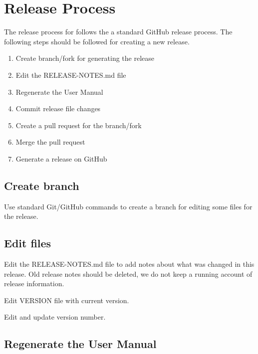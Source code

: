 
\chapter{Release Process}
\label{Release Process}

The release process for \parflow{} follows the a standard GitHub
release process.  The following steps should be followed for creating a new
\parflow{} release.

\begin{enumerate}
	\item Create branch/fork for generating the release
	\item Edit the RELEASE-NOTES.md file
	\item Regenerate the \parflow{} User Manual
        \item Commit release file changes
        \item Create a pull request for the branch/fork
        \item Merge the pull request
        \item Generate a release on GitHub
\end{enumerate}


\section{Create branch}

Use standard Git/GitHub commands to create a branch for editing some files for the release.

\section{Edit files}

Edit the RELEASE-NOTES.md file to add notes about what was changed in
this release.  Old release notes should be deleted, we do not keep a
running account of release information.

Edit VERSION file with current version.

Edit  and update version number.

\section{Regenerate the \parflow{} User Manual}

